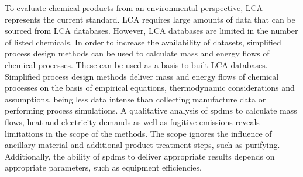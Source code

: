 To evaluate chemical products from an environmental perspective, \acf{LCA} represents the current standard. %
LCA requires large amounts of data that can be sourced from LCA databases. However, LCA databases are limited in the number of listed chemicals. In order to increase the availability of datasets, simplified process design methods can be used to calculate mass and energy flows of chemical processes. These can be used as a basis to built LCA databases. Simplified process design methods deliver mass and energy flows of chemical processes on the basis of empirical equations, thermodynamic considerations and assumptions, being less data intense than collecting manufacture data or performing process simulations. %
A qualitative analysis of \aclp{spdm} to calculate mass flows, heat and electricity demands as well as fugitive emissions reveals limitations in the scope of the methods. The scope ignores the influence of ancillary material and additional product treatment steps, such as purifying. Additionally, the ability of \aclp{spdm} to deliver appropriate results depends on appropriate parameters, such as equipment efficiencies.

